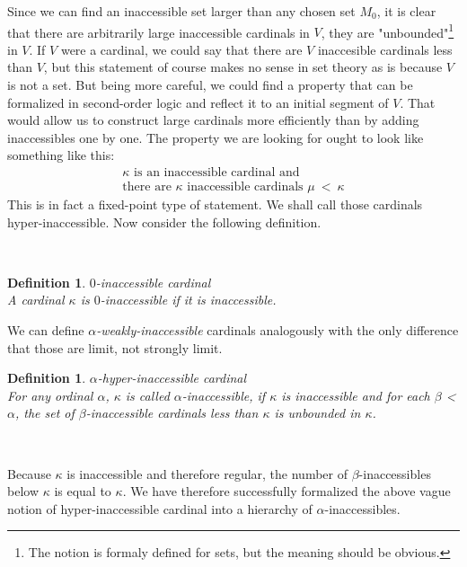 \documentclass[12pt,a4paper]{article}
\newtheorem{definition}[theorem]{Definition}
\begin{document}
\begin{}
Since we can find an inaccessible set larger than any chosen set $M_0$, it is clear that there are arbitrarily large inaccessible cardinals in $V$, they are "unbounded"\footnote{The notion is formaly defined for sets, but the meaning should be obvious.} in $V$. If $V$ were a cardinal, we could say that there are $V$ inaccesible cardinals less than $V$, but this statement of course makes no sense in set theory as is because $V$ is not a set. But being more careful, we could find a property that can be formalized in second-order logic and reflect it to an initial segment of $V$. That would allow us to construct large cardinals more efficiently than by adding inaccessibles one by one. The property we are looking for ought to look like something like this:
\begin{equation}
\begin{gathered}
\kappa \mbox{ is an inaccessible cardinal and}\\
\mbox{there are }\kappa\mbox{ inaccessible cardinals }\mu\ <\ \kappa
\end{gathered}
\end{equation}
This is in fact a fixed-point type of statement. We shall call those cardinals hyper-inaccessible. Now consider the following definition.

\

\begin{definition}{$0$-inaccessible cardinal}\\
A cardinal $\kappa$ is $0$-inaccessible if it is inaccessible.
\end{definition}
We can define \emph{$\alpha$-weakly-inaccessible} cardinals analogously with the only difference that those are limit, not strongly limit.
\

\begin{definition}{$\alpha$-hyper-inaccessible cardinal}\label{def:alpha_inaccessible}\\
For any ordinal $\alpha$, $\kappa$ is called $\alpha$-inaccessible, if $\kappa$ is inaccessible and for each $\beta$ < $\alpha$, the set of $\beta$-inaccessible cardinals less than $\kappa$ is unbounded in $\kappa$.
\end{definition}

\

Because $\kappa$ is inaccessible and therefore regular, the number of $\beta$-inaccessibles below $\kappa$ is equal to $\kappa$. We have therefore successfully formalized the above vague notion of hyper-inaccessible cardinal into a hierarchy of $\alpha$-inaccessibles.


\end{}
\end{document}

